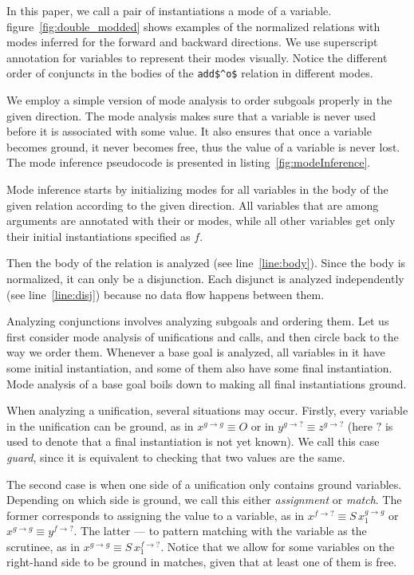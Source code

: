 In this paper, we call a pair of instantiations a mode of a variable.
figure~\ref{fig:double_modded} shows examples of the normalized \mk relations with modes inferred for the forward and backward directions.
We use superscript annotation for variables to represent their modes visually.
Notice the different order of conjuncts in the bodies of the \lstinline{add$^o$} relation in different modes.


We employ a simple version of mode analysis to order subgoals properly in the given direction.
The mode analysis makes sure that a variable is never used before it is associated with some value.
It also ensures that once a variable becomes ground, it never becomes free, thus the value of a variable is never lost.
The mode inference pseudocode is presented in listing~\ref{fig:modeInference}.






Mode inference starts by initializing modes for all variables in the body of the given relation according to the given direction.
All variables that are among arguments are annotated with their \inm or \outm modes, while all other variables get only their initial instantiations specified as $f$.

Then the body of the relation is analyzed (see line~\ref{line:body}).
Since the body is normalized, it can only be a disjunction.
Each disjunct is analyzed independently (see line~\ref{line:disj}) because no data flow happens between them.

Analyzing conjunctions involves analyzing subgoals and ordering them.
Let us first consider mode analysis of unifications and calls, and then circle back to the way we order them.
Whenever a base goal is analyzed, all variables in it have some initial instantiation, and some of them also have some final instantiation.
Mode analysis of a base goal boils down to making all final instantiations ground.

When analyzing a unification, several situations may occur.
Firstly, every variable in the unification can be ground, as in $x^{g \rightarrow g} \equiv O$ or in $y^{g \rightarrow ?} \equiv z^{g \rightarrow ?}$ (here $?$ is used to denote that a final instantiation is not yet known).
We call this case \emph{guard}, since it is equivalent to checking that two values are the same.

The second case is when one side of a unification only contains ground variables.
Depending on which side is ground, we call this either \emph{assignment} or \emph{match}.
The former corresponds to assigning the value to a variable, as in $x^{f \rightarrow ?} \equiv S \, x_1^{g \rightarrow g}$ or $x^{g \rightarrow g} \equiv y^{f \rightarrow ?}$.
The latter --- to pattern matching with the variable as the scrutinee, as in $x^{g \rightarrow g} \equiv S \, x_1^{f \rightarrow ?}$.
Notice that we allow for some variables on the right-hand side to be ground in matches, given that at least one of them is free.

